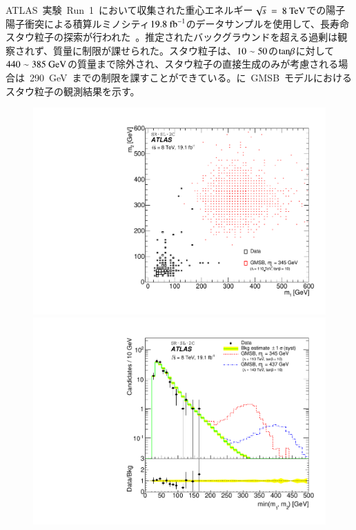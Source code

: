 ATLAS~実験~Run~1~において収集された重心エネルギー$\sqrt{s}~=~8~\rm{TeV}$での陽子陽子衝突による積算ルミノシティ$19.8~\rm{fb}^{-1}$のデータサンプルを使用して、長寿命スタウ粒子の探索が行われた~\cite{AR:03}。推定されたバックグラウンドを超える過剰は観察されず、質量に制限が課せられた。スタウ粒子は、$\rm{10\sim50}$の$\rm{tan}\beta$に対して$\rm{440\sim385~GeV}$の質量まで除外され、スタウ粒子の直接生成のみが考慮される場合は~290~GeV~までの制限を課すことができている。に~GMSB~モデルにおけるスタウ粒子の観測結果を示す。

\begin{figure}[H]
    \begin{minipage}{0.49\hsize}
    \centering   
    \includegraphics[width=\textwidth]{img/stau/fig_02a.pdf}
    \subcaption{}
    \end{minipage}
    \begin{minipage}{0.49\hsize}
    \centering   
    \includegraphics[width=\textwidth]{img/stau/fig_02b.pdf}

\end{minipage}
\end{figure}
